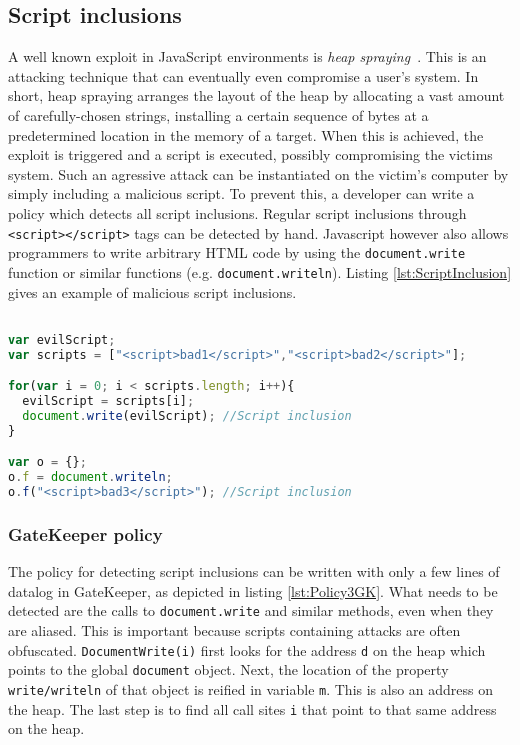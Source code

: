 \subsection{Script inclusions}
\label{subsec:ScriptInclusion}


A well known exploit in JavaScript environments is \textit{heap spraying}~\cite{HeapSpraying}. This is an attacking technique that can eventually even compromise a user's system. In short, heap spraying arranges the layout of the heap by allocating a vast amount of carefully-chosen strings, installing a certain sequence of bytes at a predetermined location in the memory of a target. When this is achieved, the exploit is triggered and a script is executed, possibly compromising the victims system. Such an agressive attack can be instantiated on the victim's computer by simply including a malicious script. To prevent this, a developer can write a policy which detects all script inclusions. Regular script inclusions through \texttt{<script></script>} tags can be detected by hand. Javascript however also allows programmers to write arbitrary HTML code by using the \texttt{document.write} function or similar functions (e.g. \texttt{document.writeln}). Listing \ref{lst:ScriptInclusion} gives an example of malicious script inclusions.

\begin{lstlisting}[label={lst:ScriptInclusion},language=JavaScript,caption=Script inclusion example,mathescape=true]  % float=t?

var evilScript;
var scripts = ["<script>bad1</script>","<script>bad2</script>"];

for(var i = 0; i < scripts.length; i++){
  evilScript = scripts[i];
  document.write(evilScript); //Script inclusion
}

var o = {};
o.f = document.writeln;
o.f("<script>bad3</script>"); //Script inclusion
\end{lstlisting}

\subsubsection*{GateKeeper policy}

The policy for detecting script inclusions can be written with only a few lines of datalog in GateKeeper, as depicted in listing \ref{lst:Policy3GK}. What needs to be detected are the calls to \texttt{document.write} and similar methods, even when they are aliased. This is important because scripts containing attacks are often obfuscated. \texttt{DocumentWrite(i)} first looks for the address \texttt{d} on the heap which points to the global \texttt{document} object. Next, the location of the property \texttt{write/writeln} of that object is reified in variable \texttt{m}. This is also an address on the heap. The last step is to find all call sites \texttt{i} that point to that same address on the heap. 

